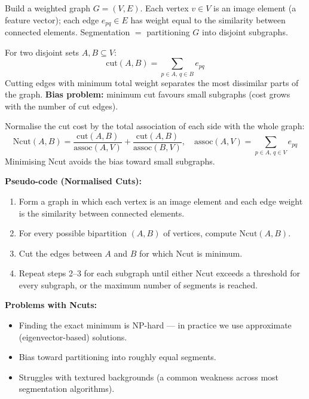 \separator

\begin{defbox}
Build a weighted graph $G = (V, E)$. Each vertex $v \in V$ is an image element (a feature vector); each edge $e_{pq} \in E$ has weight equal to the similarity between connected elements. Segmentation $=$ partitioning $G$ into disjoint subgraphs.
\end{defbox}

For two disjoint sets $A, B \subseteq V$:
\[
\mathrm{cut}(A, B) = \sum_{p \in A,\, q \in B} e_{pq}
\]
Cutting edges with minimum total weight separates the most dissimilar parts of the graph. \textbf{Bias problem:} minimum cut favours small subgraphs (cost grows with the number of cut edges).

\begin{thmbox}
Normalise the cut cost by the total association of each side with the whole graph:
\[
\mathrm{Ncut}(A, B) = \frac{\mathrm{cut}(A, B)}{\mathrm{assoc}(A, V)} + \frac{\mathrm{cut}(A, B)}{\mathrm{assoc}(B, V)},
\quad
\mathrm{assoc}(A, V) = \sum_{p \in A,\, q \in V} e_{pq}
\]
Minimising Ncut avoids the bias toward small subgraphs.
\end{thmbox}

\textbf{Pseudo-code (Normalised Cuts):}
\begin{enumerate}
  \item Form a graph in which each vertex is an image element and each edge weight is the similarity between connected elements.
  \item For every possible bipartition $(A, B)$ of vertices, compute $\mathrm{Ncut}(A, B)$.
  \item Cut the edges between $A$ and $B$ for which $\mathrm{Ncut}$ is minimum.
  \item Repeat steps 2--3 for each subgraph until either $\mathrm{Ncut}$ exceeds a threshold for every subgraph, or the maximum number of segments is reached.
\end{enumerate}

\textbf{Problems with Ncuts:}
\begin{itemize}
  \item Finding the exact minimum is NP-hard --- in practice we use approximate (eigenvector-based) solutions.
  \item Bias toward partitioning into roughly equal segments.
  \item Struggles with textured backgrounds (a common weakness across most segmentation algorithms).
\end{itemize}


